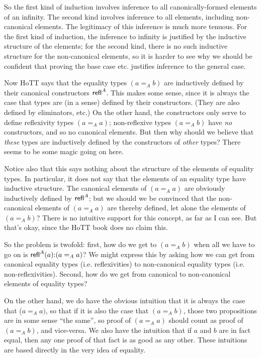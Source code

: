 \documentclass{article}
\begin{document}
So the first kind of induction involves inference to all
canonically-formed elements of an infinity.  The second kind involves
inference to all elements, including non-canonical elements.  The
legitimacy of this inference is much more tenuous.  For the first kind
of induction, the inference to infinity is justified by the inductive
structure of the elements; for the second kind, there is no such
inductive structure for the non-canonical elements, so it is harder to
see why we should be confident that proving the base case
etc. justifies inference to the general case.

Now HoTT says that the equality types \((a=_Ab)\) are inductively
defined by their canonical constructors \(\textsf{refl}^A\).  This makes some
sense, since it is always the case that types are (in a sense) defined
by their constructors.  (They are also defined by eliminators, etc.)
On the other hand, the constructors only serve to define reflexivity
types \((a=_Aa)\); non-reflexive types \((a=_Ab)\) have \emph{no}
constructors, and so no canonical elements.  But then why should we
believe that \emph{these} types are inductively defined by the
constructors of \emph{other} types?  There seems to be some magic
going on here.

Notice also that this says nothing about the structure of the elements
of equality types.  In particular, it does not say that the elements
of an equality type have inductive structure.  The canonical elements
of \((a=_Aa)\) are obviously inductively defined by \(\textsf{refl}^A\); but we
should we be convinced that the non-canonical elements of \((a=_Aa)\)
are thereby defined, let alone the elements of \((a=_Ab)\)?  There is
no intuitive support for this concept, as far as I can see.  But
that's okay, since the HoTT book does no claim this.

So the problem is twofold: first, how do we get to \((a=_Ab)\) when
all we have to go on is \(\textsf{refl}^A(a){:}(a=_Aa)\)?  We might express
this by asking how we can get from canonical equality types
(i.e. reflexivities) to non-canonical equality types
(i.e. non-reflexivities).  Second, how do we get from canonical to
non-canonical elements of equality types?

On the other hand, we do have the obvious intuition that it is always
the case that (\(a=_Aa)\), so that if it is also the case that
\((a=_Ab)\), those two propositions are in some sense ``the same'', so
proof of \((a=_Aa)\) should count as proof of \((a=_Ab)\), and
vice-versa.  We also have the intuition that if \(a\) and \(b\) are in
fact equal, then any one proof of that fact is as good as any other.
These intuitions are based directly in the very idea of equality.
\end{document}
